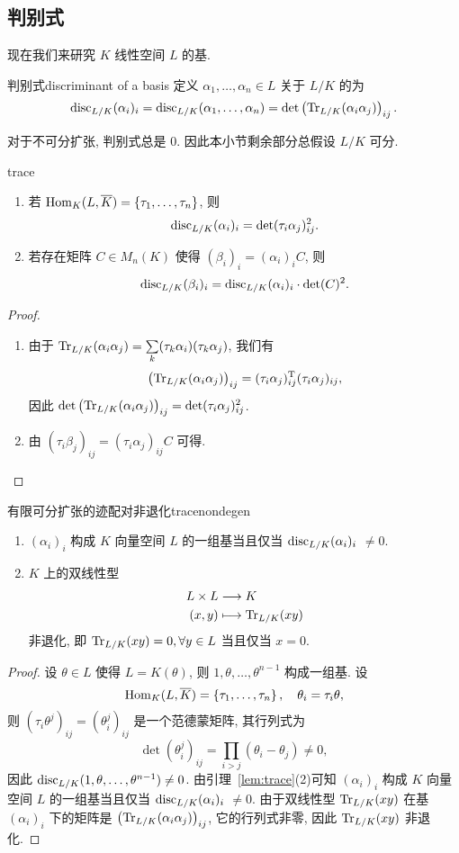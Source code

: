 \subsection{判别式}
现在我们来研究 $K$ 线性空间 $L$ 的基.
\begin{definition}{判别式}{discriminant of a basis}
定义 $\alpha_1,\dots,\alpha_n\in L$ 关于 $L/K$ 的为
  \[{\mathrm{disc}}_{L/K}(\alpha_i)_i={\mathrm{disc}}_{L/K}(\alpha_1,\dots,\alpha_n)=\det\left({\mathrm{Tr}}_{L/K}(\alpha_i\alpha_j)\right)_{ij}.\]
\end{definition}
对于不可分扩张, 判别式总是 $0$.
因此本小节剩余部分总\alert{假设 $L/K$ 可分}.
  
\begin{lemma}{}{trace}
\begin{enumerate}
  \item 若 ${\mathrm{Hom}}_K(L,\overline K)=\left\{\tau_1,\dots,\tau_n\right\}$, 则
  \[{\mathrm{disc}}_{L/K}(\alpha_i)_i=\det(\tau_i \alpha_j)_{ij}^2.\]
  \item 若存在矩阵 $C\in M_n(K)$ 使得 $(\beta_i)_i=(\alpha_i)_i C$, 则
  \[{\mathrm{disc}}_{L/K}(\beta_i)_i={\mathrm{disc}}_{L/K}(\alpha_i)_i\cdot\det(C)^2.\]
\end{enumerate}
\end{lemma}
\begin{proof}
\begin{enumerate}
  \item 由于 ${\mathrm{Tr}}_{L/K}(\alpha_i\alpha_j)=\sum\limits_k (\tau_k\alpha_i)(\tau_k\alpha_j)$, 我们有 
  \[\left({\mathrm{Tr}}_{L/K}(\alpha_i\alpha_j)\right)_{ij}=(\tau_i\alpha_j)_{ij}^{\mathrm{T}}(\tau_i\alpha_j)_{ij},\]
因此 $\det\left({\mathrm{Tr}}_{L/K}(\alpha_i\alpha_j)\right)_{ij}=\det(\tau_i\alpha_j)_{ij}^2$.
  \item 由 $(\tau_i\beta_j)_{ij}=(\tau_i\alpha_j)_{ij}C$ 可得.
\end{enumerate}
\end{proof}

\begin{proposition}{有限可分扩张的迹配对非退化}{tracenondegen}
\begin{enumerate}
  \item $(\alpha_i)_i$ 构成 $K$ 向量空间 $L$ 的一组基当且仅当 ${\mathrm{disc}}_{L/K}(\alpha_i)_i$ $\neq 0$.
  \item $K$ 上的双线性型 
  \[\begin{split}L\times L &\longrightarrow K \\ (x,y) &\longmapsto {\mathrm{Tr}}_{L/K}(xy)\end{split}\]
  非退化, 即 ${\mathrm{Tr}}_{L/K}(xy)=0,\forall y\in L$ 当且仅当 $x=0$.
\end{enumerate}
\end{proposition}
\begin{proof}
设 $\theta\in L$ 使得 $L=K(\theta)$, 则 $1,\theta,\dots,\theta^{n-1}$ 构成一组基. 设 
  \[{\mathrm{Hom}}_K(L,\overline K)=\left\{\tau_1,\dots,\tau_n\right\},\quad \theta_i=\tau_i \theta,\]
则 $(\tau_i \theta^j)_{ij}=(\theta_i^j)_{ij}$ 是一个范德蒙矩阵, 其行列式为
  \[\det(\theta_i^j)_{ij}=\prod_{i>j}(\theta_i-\theta_j)\neq 0,\]
因此 ${\mathrm{disc}}_{L/K}(1,\theta,\dots,\theta^{n-1})\neq 0$. 由引理~\ref{lem:trace}(2)可知 $(\alpha_i)_i$ 构成 $K$ 向量空间 $L$ 的一组基当且仅当 ${\mathrm{disc}}_{L/K}(\alpha_i)_i$ $\neq 0$.
由于双线性型 ${\mathrm{Tr}}_{L/K}(xy)$ 在基 $(\alpha_i)_i$ 下的矩阵是 $\left({\mathrm{Tr}}_{L/K}(\alpha_i\alpha_j)\right)_{ij}$, 它的行列式非零, 因此 ${\mathrm{Tr}}_{L/K}(xy)$ 非退化.
\end{proof}

